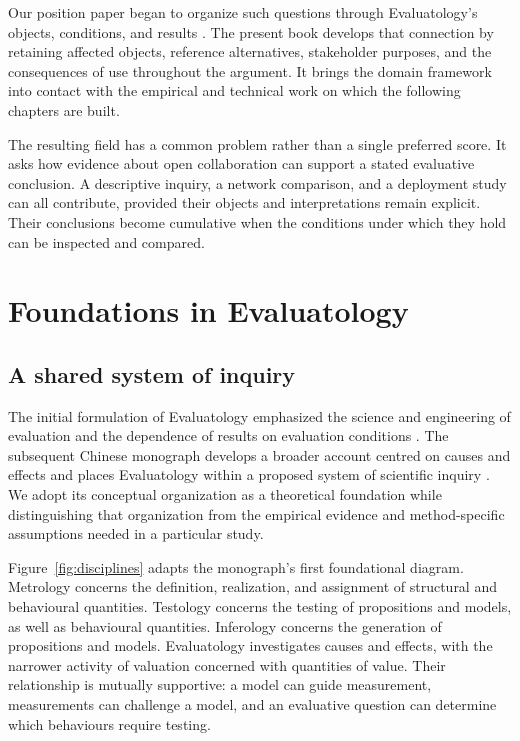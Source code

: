 Our position paper began to organize such questions through Evaluatology's objects, conditions, and results \citep{han2024ose}. The present book develops that connection by retaining affected objects, reference alternatives, stakeholder purposes, and the consequences of use throughout the argument. It brings the domain framework into contact with the empirical and technical work on which the following chapters are built.

The resulting field has a common problem rather than a single preferred score. It asks how evidence about open collaboration can support a stated evaluative conclusion. A descriptive inquiry, a network comparison, and a deployment study can all contribute, provided their objects and interpretations remain explicit. Their conclusions become cumulative when the conditions under which they hold can be inspected and compared.

\section{Foundations in Evaluatology}
\label{sec:foundations}

\subsection{A shared system of inquiry}
The initial formulation of Evaluatology emphasized the science and engineering of evaluation and the dependence of results on evaluation conditions \citep{zhan2024}. The subsequent Chinese monograph develops a broader account centred on causes and effects and places Evaluatology within a proposed system of scientific inquiry \citep{zhan2026book}. We adopt its conceptual organization as a theoretical foundation while distinguishing that organization from the empirical evidence and method-specific assumptions needed in a particular study.

Figure~\ref{fig:disciplines} adapts the monograph's first foundational diagram. Metrology concerns the definition, realization, and assignment of structural and behavioural quantities. Testology concerns the testing of propositions and models, as well as behavioural quantities. Inferology concerns the generation of propositions and models. Evaluatology investigates causes and effects, with the narrower activity of valuation concerned with quantities of value. Their relationship is mutually supportive: a model can guide measurement, measurements can challenge a model, and an evaluative question can determine which behaviours require testing.

